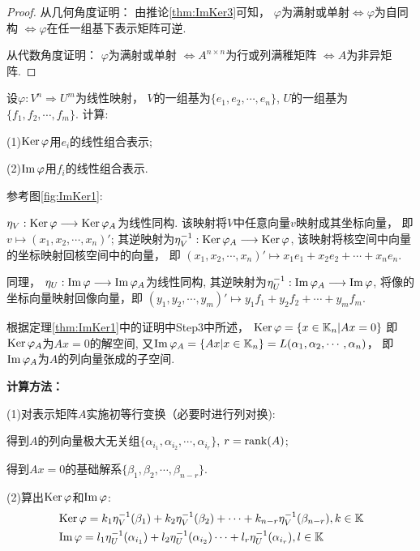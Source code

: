 \begin{proof}
  从几何角度证明：
  由推论\ref{thm:ImKer3}可知，
  $\varphi$为满射或单射$\Longleftrightarrow \varphi$为自同构
  $\Longleftrightarrow \varphi$在任一组基下表示矩阵可逆.

  从代数角度证明：
  $\varphi$为满射或单射 $\Longleftrightarrow A^{n \times n}$为行或列满稚矩阵
  $\Longleftrightarrow A$为非异矩阵. 
\end{proof}

\begin{example}
  设$\varphi: V^n \Longrightarrow U^m$为线性映射，
  $V$的一组基为$\{e_1, e_2,\cdots,e_n\}$,
  $U$的一组基为$\{f_1, f_2,\cdots,f_m\}$.
  计算:

  (1)$\operatorname{Ker}\varphi$用$e_i$的线性组合表示;

  (2)$\operatorname{Im}\varphi$用$f_i$的线性组合表示. 
\end{example}

\begin{solution}
  参考图\ref{fig:ImKer1}:
  
  $\eta_V: \operatorname{Ker}\varphi \longrightarrow \operatorname{Ker}\varphi_A$为线性同构.
  该映射将$V$中任意向量$v$映射成其坐标向量， 即
  $v \mapsto (x_1, x_2,\cdots,x_n)'$; 
  其逆映射为$\eta_V^{-1}: \operatorname{Ker}\varphi_A \longrightarrow \operatorname{Ker}\varphi$,
  该映射将核空间中向量的坐标映射回核空间中的向量， 即
  $(x_1, x_2, \cdots, x_n)' \mapsto x_1e_1 + x_2e_2+ \cdots + x_ne_n$. 

  同理， $\eta_U: \operatorname{Im}\varphi \longrightarrow \operatorname{Im}\varphi_A$为线性同构,
  其逆映射为$\eta_U^{-1}: \operatorname{Im}\varphi_A \longrightarrow \operatorname{Im}\varphi$, 
  将像的坐标向量映射回像向量，即
  $(y_1, y_2, \cdots, y_m)' \mapsto y_1f_1 + y_2f_2+ \cdots + y_mf_m$.

  根据定理\ref{thm:ImKer1}中的证明中Step3中所述，
  $\operatorname{Ker}\varphi =\{x \in \mathbb{K}_n|Ax=0\}$
  即$\operatorname{Ker}\varphi_A$为$Ax = 0$的解空间,
  又$\operatorname{Im}\varphi_A = \{Ax|x \in \mathbb{K}_n\}
  = L(\alpha_1, \alpha_2, \cdots, \alpha_n)$， 即
  $\operatorname{Im}\varphi_A$为$A$的列向量张成的子空间.

  \textbf{计算方法：}

  (1)对表示矩阵$A$实施初等行变换（必要时进行列对换):
  
  得到$A$的列向量极大无关组$\{\alpha_{i_1},\alpha_{i_2},\cdots,\alpha_{i_r}\}$,
  $r = \operatorname{rank}(A)$;

  得到$Ax=0$的基础解系$\{\beta_1,\beta_2,\cdots,\beta_{n-r}\}$.
  
  (2)算出$\operatorname{Ker}\varphi$和$\operatorname{Im}\varphi$: 
  \begin{align*}
       & \operatorname{Ker}\varphi = k_1\eta_V^{-1}(\beta_1)+k_2\eta_V^{-1}(\beta_2)
         +\cdots+k_{n-r}\eta_V^{-1}(\beta_{n-r}), k \in \mathbb{K}\\
       & \operatorname{Im}\varphi = l_1\eta_U^{-1}(\alpha_{i_1})+l_2\eta_U^{-1}(\alpha_{i_2})
         \cdots+l_r\eta_U^{-1}(\alpha_{i_r}), l \in \mathbb{K}      
   \end{align*} 
 \end{solution}

